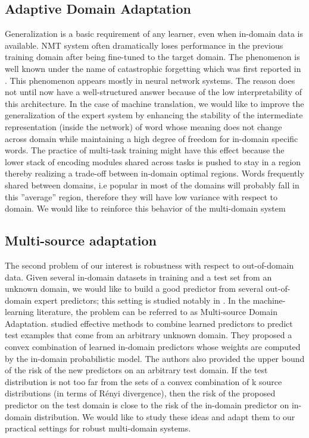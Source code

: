 \documentclass[12pt,a4paper,twoside]{report}
\theoremstyle{definition}
\begin{document}
\subsection*{Adaptive Domain Adaptation}
Generalization is a basic requirement of any learner, even when in-domain data is available. NMT system often dramatically loses performance in the previous training domain after being fine-tuned to the target domain. The phenomenon is well known under the name of catastrophic forgetting which was first reported in \cite{Michael89catastrophic}. This phenomenon appears mostly in neural network systems. The reason does not until now have a well-structured answer because of the low interpretability of this architecture. In the case of machine translation, we would like to improve the generalization of the expert
system by enhancing the stability of the intermediate representation (inside the network) of word whose meaning does not change across domain while maintaining a high degree of freedom for in-domain specific words. The practice of multi-task training might have
this effect because the lower stack of encoding modules shared across tasks is pushed to stay in a region thereby realizing a trade-off between in-domain optimal regions. Words frequently shared between domains, i.e popular in most of the domains will probably fall in
this ”average” region, therefore they will have low variance with respect to domain. We would like to reinforce this behavior of the multi-domain system 

\subsection*{Multi-source adaptation}
The second problem of our interest is robustness with respect to out-of-domain data. Given several in-domain datasets in training and a test set from an unknown domain, we would like to build a good predictor from several out-of-domain expert predictors; this setting is studied notably in \citep{hoffman18algorithms}. In the machine-learning literature, the problem can be referred to as Multi-source Domain Adaptation. \cite{yishay09multiple,mansour09domain} studied effective methods to combine learned predictors to predict test examples that come from an arbitrary unknown domain. They proposed a convex combination of learned in-domain predictors whose weights are computed by the in-domain probabilistic model. The authors also provided the upper bound of the risk of the new predictors on an arbitrary test domain. If the test distribution is not too far from the sets of a convex combination of k source distributions (in terms of Rényi divergence), then the risk of the proposed predictor on the test domain is close to the risk of the in-domain predictor on in-domain distribution. We would like to study these ideas and adapt them to our practical settings for robust multi-domain systems.
\end{document}
